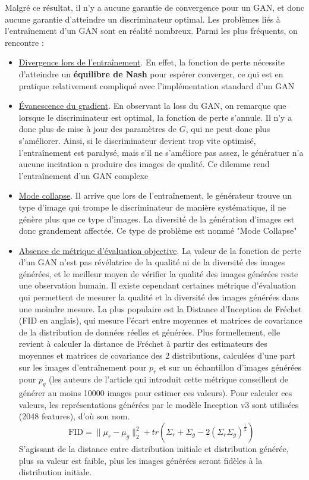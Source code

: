 \documentclass{article}
\begin{document}
Malgré ce résultat, il n'y a aucune garantie de convergence pour un GAN, et donc aucune garantie d'atteindre un discriminateur optimal. Les problèmes liés à l'entraînement d'un GAN sont en réalité nombreux. Parmi les plus fréquents, on rencontre :
\begin{itemize}
    \item \underline{Divergence lors de l'entraînement}. En effet, la fonction de perte nécessite d'atteindre un \textbf{équilibre de Nash} pour espérer converger, ce qui est en pratique relativement compliqué avec l'implémentation standard d'un GAN
    \item \underline{Évanescence du gradient}. En observant la loss du GAN, on remarque que lorsque le discriminateur est optimal, la fonction de perte s'annule. Il n'y a donc plus de mise à jour des paramètres de $G$, qui ne peut donc plus s'améliorer. Ainsi, si le discriminateur devient trop vite optimisé, l'entraînement est paralysé, mais s'il ne s'améliore pas assez, le génératuer n'a aucune incitation a produire des images de qualité. Ce dilemme rend l'entraînement d'un GAN complexe
    \item \underline{Mode collapse}. Il arrive que lors de l'entraînement, le générateur trouve un type d'image qui trompe le discriminateur de manière systématique, il ne génère plus que ce type d'images. La diversité de la génération d'images est donc grandement affectée. Ce type de problème est nommé "Mode Collapse"
    \item \underline{Absence de métrique d'évaluation objective}. La valeur de la fonction de perte d'un GAN n'est pas révélatrice de la qualité ni de la diversité des images générées, et le meilleur moyen de vérifier la qualité des images générées reste une observation humain. Il existe cependant certaines métrique d'évaluation qui permettent de mesurer la qualité et la diversité des images générées dans une moindre mesure. La plus populaire est la Distance d'Inception de Fréchet (FID en anglais), qui mesure l'écart entre moyennes et matrices de covariance de la distribution de données réelles et générées. Plus formellement, elle revient à calculer la distance de Fréchet à partir des estimateurs des moyennes et matrices de covariance des 2 distributions, calculées d'une part sur les images d'entraînement pour $p_r$ et sur un échantillon d'images générées pour $p_g$ (les auteurs de l'article \cite{fid} qui introduit cette métrique conseillent de générer au moins 10000 images pour estimer ces valeurs). Pour calculer ces valeurs, les représentations générées par le modèle Inception v3 \cite{inception} sont utilisées (2048 features), d'où son nom.
    $$\text{FID} = \lVert\mu_r - \mu_g\rVert^2_2 + tr(\Sigma_r + \Sigma_g - 2(\Sigma_r \Sigma_g)^{\frac{1}{2}})$$
    S'agissant de la distance entre distribution initiale et distribution générée, plus sa valeur est faible, plus les images générées seront fidèles à la distribution initiale.
\end{itemize}
\end{document}

